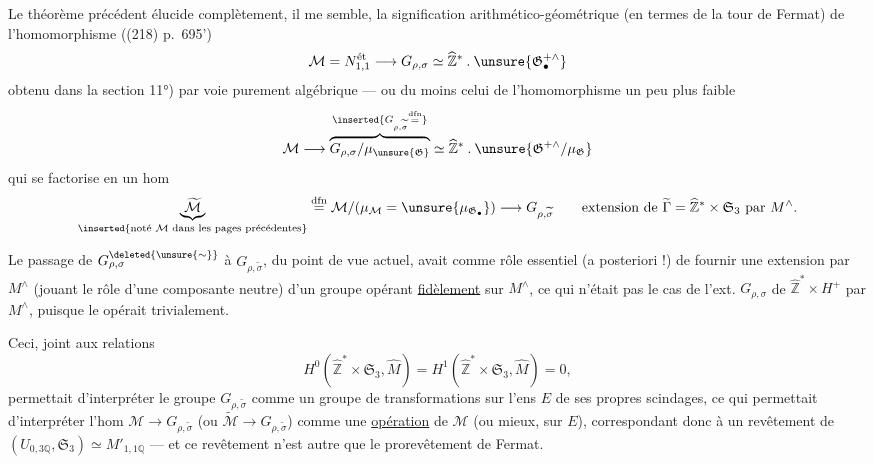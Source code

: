 Le théorème précédent élucide complètement, il me semble, la signification arithmético-géométrique (en termes de la tour de Fermat) de l'homomorphisme ((218) p.~695')
\[
\mathcal M=N_{1,1}^{\text{ét}}\longrightarrow G_{\rho,\sigma}\simeq\widehat{\mathbb Z}^{*}\mathbin{.}\unsure{\mathfrak G_{\bullet}^{+\wedge}}
\]
obtenu dans la section 11°) par voie purement algébrique --- ou du moins celui de l'homomorphisme un peu plus faible
\[
\mathcal M\longrightarrow\overbrace{G_{\rho,\sigma}/\mu_{\unsure{\mathfrak G}}}^{\inserted{G_{\rho,\widetilde{\sigma}}\overset{\mathrm{dfn}}{=}}}\simeq\widehat{\mathbb Z}^{*}\mathbin{.}\unsure{\mathfrak G^{+\wedge}/\mu_{\mathfrak G}}
\]
qui se factorise  en un hom
\[
\underbrace{\widetilde{\mathcal M}}_{\inserted{\text{noté }\mathcal M\text{ dans les pages précédentes}}}\overset{\mathrm{dfn}}{=}\mathcal M/(\mu_{\mathcal M}=\unsure{\mu_{\mathfrak G_\bullet}})\longrightarrow G_{\rho,\widetilde{\sigma}}
\qquad\text{extension de }\widetilde\Gamma=\widehat{\mathbb Z}^{*}\times\mathfrak S_3\text{ par }M^\wedge.
\]

Le passage de $G_{\rho,\sigma}^{\deleted{\unsure{\sim}}}$ à $G_{\rho,\widetilde{\sigma}}$, du point de vue actuel, avait comme rôle essentiel (a posteriori !) de fournir une extension par $M^\wedge$ (jouant le rôle d'une composante neutre) d'un groupe opérant \uline{fidèlement} sur $M^\wedge$, ce qui n'était pas le cas de l'ext. $G_{\rho,\sigma}$ de $\widehat{\mathbb Z}^{*}\times H^+$ par $M^\wedge$, puisque le   opérait trivialement.


Ceci, joint aux relations
\[
H^0(\widehat{\mathbb Z}^{*}\times\mathfrak S_3,\widehat M)=H^1(\widehat{\mathbb Z}^{*}\times\mathfrak S_3,\widehat M)=0,
\]
permettait d'interpréter le groupe $G_{\rho,\widetilde\sigma}$ comme un groupe de transformations sur l'ens $E$ de ses propres scindages, ce qui permettait d'interpréter l'hom $\mathcal M\to G_{\rho,\widetilde\sigma}$ (ou $\widetilde{\mathcal M}\to G_{\rho,\widetilde\sigma}$) comme une  \uline{opération} de $\mathcal M$  (ou mieux,  sur $E$), correspondant donc à un revêtement  de $(U_{0,3\mathbb Q},\mathfrak S_3)\simeq M'_{1,1\mathbb Q}$ --- et ce revêtement n'est autre que le prorevêtement de Fermat.

